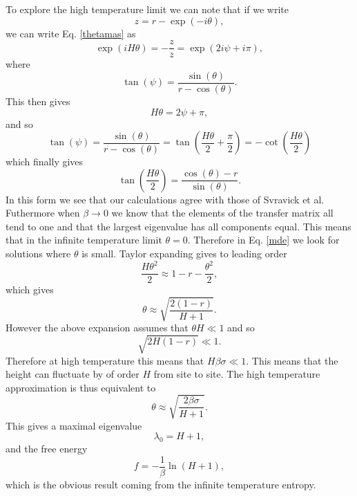 To explore the high temperature limit we can note that if we write
\begin{equation}
    z= r-\exp(-i\theta),
\end{equation}
we can write Eq. \eqref{thetamas} as
\begin{equation}
    \exp(iH\theta)  = -\frac{z}{\overline z} = \exp(2i\psi + i\pi),
\end{equation}
where
\begin{equation}
    \tan(\psi) = \frac{\sin(\theta)}{r-\cos(\theta)}.
\end{equation}
This then gives 
\begin{equation}
    H\theta = 2\psi + \pi,
\end{equation}
and so
\begin{equation}
    \tan(\psi) = \frac{\sin(\theta)}{r-\cos(\theta)}= \tan(\frac{H\theta}{2} +\frac{\pi}{2})= -\cot(\frac{H\theta}{2})
\end{equation}
which finally gives
\begin{equation}
    \tan(\frac{H\theta}{2}) = \frac{\cos(\theta)-r}{\sin(\theta)}.
    \label{mde}
\end{equation}
In this form we see that our calculations agree with those of Svravick et al. Futhermore when $\beta\to 0$ we know that the elements of the transfer matrix all tend to one and that the largest eigenvalue has all components equal. This means that in the  infinite temperature limit $\theta=0$. Therefore in Eq. \eqref{mde} we look for solutions where $\theta$ is small. Taylor expanding gives to leading order
\begin{equation}
    \frac{H\theta^2}{2} \approx1-r-\frac{\theta^2}{2},
\end{equation}
which gives
\begin{equation}
    \theta \approx \sqrt{\frac{2(1-r)}{H+1}}.
\end{equation}
However the above expansion assumes that $\theta H\ll1$ and so
\begin{equation}
    \sqrt{2H(1-r)} \ll 1.
\end{equation}
Therefore at high temperature this means that $H\beta\sigma\ll1$. This means that the height can fluctuate by of order $H$ from site to site. The high temperature approximation is thus equivalent to
 \begin{equation}
    \theta \approx \sqrt{\frac{2\beta\sigma}{H+1}}.
\end{equation}
This gives a maximal eigenvalue
\begin{equation}
    \lambda_0 = H+1,
\end{equation}
and the free energy
\begin{equation}
    f=-\frac{1}{\beta}\ln(H+1),
\end{equation}
which is the obvious result coming from the infinite temperature entropy. 

